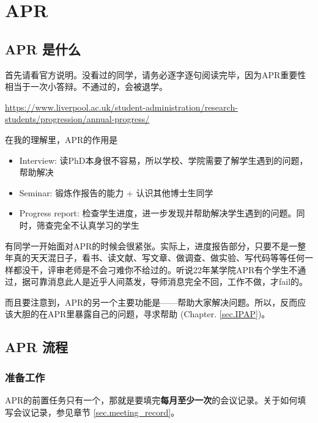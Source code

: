 \section{APR}
\subsection{APR 是什么}
首先请看官方说明。没看过的同学，请务必逐字逐句阅读完毕，因为APR重要性相当于一次小答辩。不通过的，会被退学。

\url{https://www.liverpool.ac.uk/student-administration/research-students/progression/annual-progress/}

在我的理解里，APR的作用是
\begin{itemize}
    \item Interview: 读PhD本身很不容易，所以学校、学院需要了解学生遇到的问题，帮助解决
    \item Seminar: 锻炼作报告的能力 + 认识其他博士生同学
    \item Progress report: 检查学生进度，进一步发现并帮助解决学生遇到的问题。同时，筛查完全不认真学习的学生
\end{itemize}

有同学一开始面对APR的时候会很紧张。实际上，进度报告部分，只要不是一整年真的天天混日子，看书、读文献、写文章、做调查、做实验、写代码等等任何一样都没干，评审老师是不会刁难你不给过的。听说22年某学院APR有个学生不通过，据可靠消息此人是近乎人间蒸发，导师消息完全不回，工作不做，才fail的。

而且要注意到，APR的另一个主要功能是——帮助大家解决问题。所以，反而应该大胆的在APR里暴露自己的问题，寻求帮助 (Chapter. \ref{sec.IPAP})。

\subsection{APR 流程}
\subsubsection{准备工作}
APR的前置任务只有一个，那就是要填完\textbf{每月至少一次}的会议记录。关于如何填写会议记录，参见章节 \ref{sec.meeting_record}。

